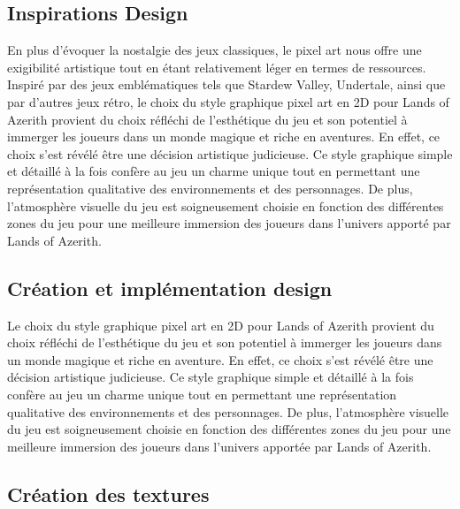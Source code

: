 
\subsection{Inspirations Design} %

En plus d'évoquer la nostalgie des jeux classiques, le pixel art nous offre une exigibilité artistique tout en étant relativement léger en termes de ressources.
Inspiré par des jeux emblématiques tels que Stardew Valley, Undertale, ainsi que par d'autres jeux rétro, le choix du style graphique pixel art en 2D pour Lands of Azerith provient du choix réfléchi de l'esthétique du jeu et son potentiel à immerger les joueurs dans un monde magique et riche en aventures.
En effet, ce choix s'est révélé être une décision artistique judicieuse.
Ce style graphique simple et détaillé à la fois confère au jeu un charme unique tout en permettant une représentation qualitative des environnements et des personnages.
De plus, l'atmosphère visuelle du jeu est soigneusement choisie en fonction des différentes zones du jeu pour une meilleure immersion des joueurs dans l'univers apporté par Lands of Azerith.
\\

\subsection{Création et implémentation design} %

Le choix du style graphique pixel art en 2D pour Lands of Azerith provient du choix réfléchi de l'esthétique du jeu et son potentiel à immerger les joueurs dans un monde magique et riche en aventure.
En effet, ce choix s'est révélé être une décision artistique judicieuse.
Ce style graphique simple et détaillé à la fois confère au jeu un charme unique tout en permettant une représentation qualitative des environnements et des personnages.
De plus, l'atmosphère visuelle du jeu est soigneusement choisie en fonction des différentes zones du jeu pour une meilleure immersion des joueurs dans l'univers apportée par Lands of Azerith.
\\

\subsection{Création des textures}

